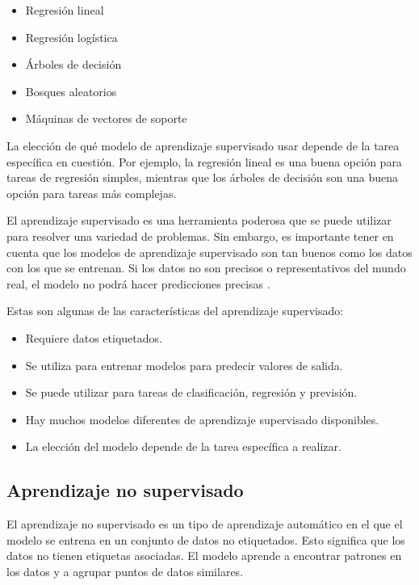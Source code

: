 \begin{itemize}
    \item Regresión lineal
    \item Regresión logística
    \item Árboles de decisión
    \item Bosques aleatorios
    \item Máquinas de vectores de soporte 
\end{itemize}

La elección de qué modelo de aprendizaje supervisado usar depende de la tarea específica en cuestión. Por ejemplo, la regresión lineal es una buena opción para tareas de regresión simples, mientras que los árboles de decisión son una buena opción para tareas más complejas.

El aprendizaje supervisado es una herramienta poderosa que se puede utilizar para resolver una variedad de problemas. Sin embargo, es importante tener en cuenta que los modelos de aprendizaje supervisado son tan buenos como los datos con los que se entrenan. Si los datos no son precisos o representativos del mundo real, el modelo no podrá hacer predicciones precisas \cite{nguyen2015aprendizaje}.

Estas son algunas de las características del aprendizaje supervisado:

\begin{itemize}
    \item Requiere datos etiquetados.
    \item Se utiliza para entrenar modelos para predecir valores de salida.
    \item Se puede utilizar para tareas de clasificación, regresión y previsión.
    \item Hay muchos modelos diferentes de aprendizaje supervisado disponibles.
    \item La elección del modelo depende de la tarea específica a realizar.
\end{itemize}

\subsection{Aprendizaje no supervisado}
El aprendizaje no supervisado es un tipo de aprendizaje automático en el que el modelo se entrena en un conjunto de datos no etiquetados. Esto significa que los datos no tienen etiquetas asociadas. El modelo aprende a encontrar patrones en los datos y a agrupar puntos de datos similares.


